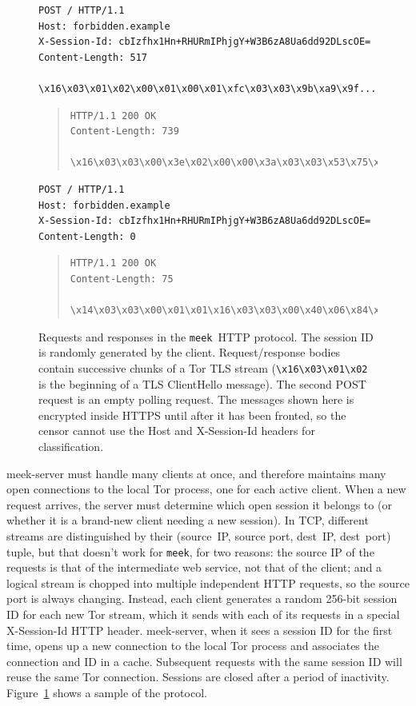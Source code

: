 \documentclass[conference]{IEEEtran}
\newcommand{\meekserver}{\mbox{meek-server}\xspace}
\newcommand{\meek}{\texttt{meek}\xspace}
\begin{document}
\begin{figure}
\scriptsize
\begin{verbatim}
POST / HTTP/1.1
Host: forbidden.example
X-Session-Id: cbIzfhx1Hn+RHURmIPhjgY+W3B6zA8Ua6dd92DLscOE=
Content-Length: 517

\x16\x03\x01\x02\x00\x01\x00\x01\xfc\x03\x03\x9b\xa9\x9f...
\end{verbatim}
\smallskip
\begin{quote}
\begin{verbatim}
HTTP/1.1 200 OK
Content-Length: 739

\x16\x03\x03\x00\x3e\x02\x00\x00\x3a\x03\x03\x53\x75\xa2...
\end{verbatim}
\end{quote}
\smallskip
\begin{verbatim}
POST / HTTP/1.1
Host: forbidden.example
X-Session-Id: cbIzfhx1Hn+RHURmIPhjgY+W3B6zA8Ua6dd92DLscOE=
Content-Length: 0

\end{verbatim}
\smallskip
\begin{quote}
\begin{verbatim}
HTTP/1.1 200 OK
Content-Length: 75

\x14\x03\x03\x00\x01\x01\x16\x03\x03\x00\x40\x06\x84\x25...
\end{verbatim}
\end{quote}
\caption{
Requests and responses in the \meek\ HTTP protocol.
The session ID is randomly generated by the client.
Request/response bodies contain successive chunks of a Tor TLS stream
(\texttt{\textbackslash{}x16\textbackslash{}x03\textbackslash{}x01\textbackslash{}x02}
is the beginning of a TLS ClientHello message).
The second POST request is an empty polling request.
The messages shown here is encrypted inside HTTPS until after
it has been fronted,
so the censor cannot use the
Host and X-Session-Id headers for classification.
}
\label{fig:protocol}
\end{figure}

\meekserver must handle many clients at once,
and therefore maintains many open connections to the local Tor process,
one for each active client.
When a new request arrives, the server must determine which
open session it belongs to
(or whether it is a brand-new client needing a new session).
In TCP, different streams are distinguished by their
(source~IP, source port, dest~IP, dest~port) tuple,
but that doesn't work for \meek, for two reasons:
the source IP of the requests is that of the intermediate web service,
not that of the client;
and a logical stream is chopped into multiple independent HTTP requests,
so the source port is always changing.
Instead, each client generates a random 256-bit session ID for each new Tor stream,
which it sends with each of its requests in a special
X-Session-Id HTTP header.
\meekserver, when it sees a session ID for the first time,
opens up a new connection to the local Tor process
and associates the connection and ID in a cache.
Subsequent requests with the
same session ID will reuse the same Tor connection.
Sessions are closed after a period of inactivity.
Figure~\ref{fig:protocol} shows a sample of the protocol.
\end{document}
